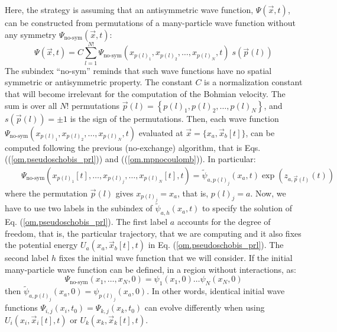 \documentclass[onecolumn,nofootinbib, secnumarabic, amsmath, nobibnotes,11pt,aps,pra]{revtex4-1}
\newcommand{\pref}[1]{(\ref{#1})}
\newcommand{\eref}[1]{Eq. (\ref{#1})}
\begin{document}
Here, the strategy is assuming that an antisymmetric wave function,
$\Psi (\vec x,t)$, can be constructed from permutations of a
many-particle wave function without any symmetry $\Psi_\textrm{no-sym}(\vec
x,t)$:
\begin{equation}
\label{om.prl_sumexbis}
\Psi(\vec{x},{t}) = C \sum\limits_{l = 1}^{N!} \Psi_\textrm{no-sym}(x_{p(l)_1},x_{p(l)_2}, \ldots ,x_{p(l)_N},t) \; s\left( \vec{p}(l) \right)
\end{equation}
The subindex ``no-sym'' reminds that such wave functions have no
spatial symmetric or antisymmetric property. The constant $C$ is a
normalization constant that will become irrelevant for the
computation of the Bohmian velocity. The sum is over all $N!$
permutations $\vec{p}(l) = \left\{
p{{(l)}_{1}},p{{(l)}_{2}},\ldots,p{{(l)}_{N}} \right\}$, and
$s\left( \vec{p}(l) \right) = \pm 1$ is the sign of the
permutations. Then, each wave function
$\Psi_\textrm{no-sym}(x_{p(l)_1},x_{p(l)_2}, \ldots , x_{p(l)_N},t)$
evaluated at $\vec x = \{x_a,\vec x_b[t]\}$, can be computed
following the previous (no-exchange) algorithm, that is  Eqs.
(\pref{om.pseudoschobis_prl}) and (\pref{om.mpnocoulomb}). In
particular:
\begin{eqnarray}
\label{om.prl_def}
&&\Psi_\textrm{no-sym}(x_{p(l)_1}[t],\ldots , x_{p(l)_j},\ldots ,
x_{p(l)_N}[t],t) = \tilde{\psi}_{a,{p}(l)_j}(x_a,t) \exp { (z_{a,\vec{p}(l)}(t)) }
\end{eqnarray}
where the permutation $\vec p(l)$ gives $x_{p(l)_j} = x_a$, that is, ${p(l)_j} = a$. Now, we have to use two labels in the subindex of $\tilde{\psi}_{a,h}(x_a,t)$ to specify the solution of \eref{om.pseudoschobis_prl}. The first label $a$ accounts for the degree of freedom, that is, the particular trajectory, that we are computing and it also fixes the potential energy $U_{a}(x_{a},\vec x_{b}[t],t)$ in \eref{om.pseudoschobis_prl}. The second label $h$ fixes the initial wave function that we will consider. If the initial many-particle wave function can be defined, in a region without interactions, as:
\begin{equation}
\label{om.prl_defini}
\Psi_\textrm{no-sym}(x_{1}, \ldots ,x_{N},0) = \psi_1(x_1,0) \ldots\psi_N(x_N,0)
\end{equation}
then $\tilde{\psi}_{a,{p}(l)_j}(x_a,0) = \psi_{p(l)_j}(x_a,0)$. In other words, identical initial wave functions $\Psi_{i,j}(x_{i},t_{0}) = \Psi_{k,j}(x_{k},t_{0})$ can evolve differently when using $U_{i}(x_{i},\vec{x}_{i}[t],t)$ or $U_{k}(x_{k},\vec{x}_{k}[t],t)$.
\end{document}
